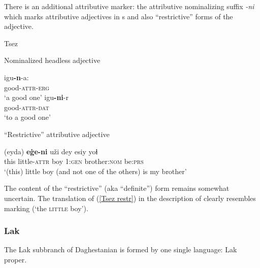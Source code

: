 There is an additional attributive marker: the attributive nominalizing suffix \textit{-ni} which marks attributive adjectives in s and also “restrictive” forms of the adjective.
\begin{exe}
\ex 
\rm{Tsez \citep{alekseev-etal2004}}
\begin{xlist}
\ex	
\rm{Nominalized headless adjective}
\begin{xlist}
\ex
\gll	igu\textbf{-n}-a:\\
	good-\textsc{attr}-\textsc{erg}\\
\glt	‘a good one’
\ex
\gll	igu\textbf{-ni}-r\\
	good-\textsc{attr}-\textsc{dat}\\
\glt	‘to a good one’
\end{xlist}

\ex	
\rm{“Restrictive” attributive adjective}
\begin{xlist}
\ex	
\label{Tsez restr}
\gll	(eyda) \textbf{eġe-ni} uži dey esiy yoɬ\\
	this little-\textsc{attr} boy \textsc{1:gen} brother:\textsc{nom} be:\textsc{prs}\\
\glt	‘(this) little boy (and not one of the others) is my brother’
\end{xlist}
\end{xlist}
\end{exe}
The content of the “restrictive” (aka “definite”) form remains somewhat uncertain. The translation of (\ref{Tsez restr}) in the description of \citet[128]{alekseev-etal2004} clearly resembles  marking (‘the \textsc{little} boy’).

\subsubsection{Lak}
The Lak subbranch of Daghestanian is formed by one single language: Lak proper.

